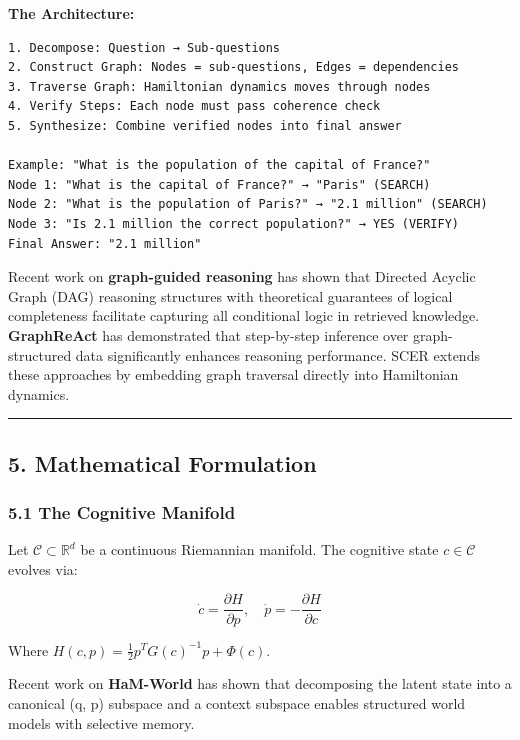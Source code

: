 \documentclass[
  11pt,
  a4paper,
]{article}
\begin{document}
\textbf{The Architecture:}

\begin{verbatim}
1. Decompose: Question → Sub-questions
2. Construct Graph: Nodes = sub-questions, Edges = dependencies
3. Traverse Graph: Hamiltonian dynamics moves through nodes
4. Verify Steps: Each node must pass coherence check
5. Synthesize: Combine verified nodes into final answer

Example: "What is the population of the capital of France?"
Node 1: "What is the capital of France?" → "Paris" (SEARCH)
Node 2: "What is the population of Paris?" → "2.1 million" (SEARCH)
Node 3: "Is 2.1 million the correct population?" → YES (VERIFY)
Final Answer: "2.1 million"
\end{verbatim}

Recent work on \textbf{graph-guided reasoning} has shown that Directed
Acyclic Graph (DAG) reasoning structures with theoretical guarantees of
logical completeness facilitate capturing all conditional logic in
retrieved knowledge. \textbf{GraphReAct} has demonstrated that
step-by-step inference over graph-structured data significantly enhances
reasoning performance. SCER extends these approaches by embedding graph
traversal directly into Hamiltonian dynamics.

\begin{center}\rule{0.5\linewidth}{0.5pt}\end{center}

\subsection{5. Mathematical Formulation}\label{mathematical-formulation}

\subsubsection{5.1 The Cognitive
Manifold}\label{the-cognitive-manifold-1}

Let \(\mathcal{C} \subset \mathbb{R}^d\) be a continuous Riemannian
manifold. The cognitive state \(c \in \mathcal{C}\) evolves via:

\[
\dot{c} = \frac{\partial H}{\partial p}, \quad \dot{p} = -\frac{\partial H}{\partial c}
\]

Where \(H(c,p) = \frac{1}{2} p^T G(c)^{-1} p + \Phi(c)\).

Recent work on \textbf{HaM-World} has shown that decomposing the latent
state into a canonical (q, p) subspace and a context subspace enables
structured world models with selective memory.
\end{document}
